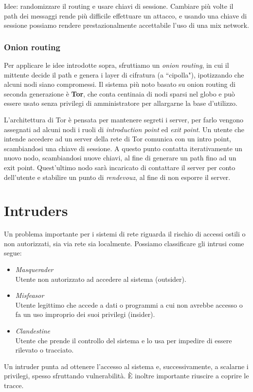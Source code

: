 \documentclass[a4paper, 11pt, twoside, openright, fleqn]{report}
\begin{document}
Idee: randomizzare il routing e usare chiavi di sessione. Cambiare più volte il path dei messaggi rende più difficile effettuare un attacco, e usando una chiave di sessione possiamo rendere prestazionalmente accettabile l'uso di una mix network.

\subsection{Onion routing}
Per applicare le idee introdotte sopra, sfruttiamo un \emph{onion routing}, in cui il mittente decide il path e genera i layer di cifratura (a ``cipolla"), ipotizzando che alcuni nodi siano compromessi.
Il sistema più noto basato su onion routing di seconda generazione è \textbf{Tor}, che conta centinaia di nodi sparsi nel globo e può essere usato senza privilegi di amministratore per allargarne la base d'utilizzo.

L'architettura di Tor è pensata per mantenere segreti i server, per farlo vengono assegnati ad alcuni nodi i ruoli di \emph{introduction point} ed \emph{exit point}. Un utente che intende accedere ad un server della rete di Tor comunica con un intro point, scambiandosi una chiave di sessione. A questo punto contatta iterativamente un nuovo nodo, scambiandosi nuove chiavi, al fine di generare un path fino ad un exit point. Quest'ultimo nodo sarà incaricato di contattare il server per conto dell'utente e stabilire un punto di \emph{rendevouz}, al fine di non esporre il server.



\chapter{Intruders}
Un problema importante per i sistemi di rete riguarda il rischio di accessi ostili o non autorizzati, sia via rete sia localmente. Possiamo classificare gli intrusi come segue:
\begin{itemize}
	\item \emph{Masquerader}\\
	Utente non autorizzato ad accedere al sistema (outsider).
	\item \emph{Misfeasor}\\
	Utente legittimo che accede a dati o programmi a cui non avrebbe accesso o fa un uso improprio dei suoi privilegi (insider).
	\item \emph{Clandestine}\\
	Utente che prende il controllo del sistema e lo usa per impedire di essere rilevato o tracciato.
\end{itemize}
Un intruder punta ad ottenere l'accesso al sistema e, successivamente, a scalarne i privilegi, spesso sfruttando vulnerabilità. \`E inoltre importante riuscire a coprire le tracce.
\end{document}
